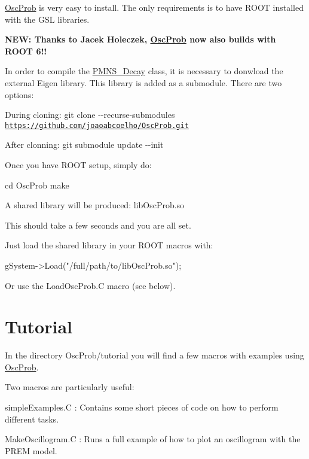 \hyperlink{namespaceOscProb}{Osc\+Prob} is very easy to install. The only requirements is to have R\+O\+OT installed with the G\+SL libraries.

{\bfseries N\+EW\+: Thanks to Jacek Holeczek, \hyperlink{namespaceOscProb}{Osc\+Prob} now also builds with R\+O\+OT 6!!}

In order to compile the \hyperlink{classOscProb_1_1PMNS__Decay}{P\+M\+N\+S\+\_\+\+Decay} class, it is necessary to donwload the external Eigen library. This library is added as a submodule. There are two options\+:
\begin{DoxyItemize}
\item During cloning\+: {\ttfamily git clone -\/-\/recurse-\/submodules \href{https://github.com/joaoabcoelho/OscProb.git}{\tt https\+://github.\+com/joaoabcoelho/\+Osc\+Prob.\+git}}
\item After clonning\+: {\ttfamily git submodule update -\/-\/init}
\end{DoxyItemize}

Once you have R\+O\+OT setup, simply do\+: 
\begin{DoxyCode}
cd OscProb
make
\end{DoxyCode}


A shared library will be produced\+: {\ttfamily lib\+Osc\+Prob.\+so}

This should take a few seconds and you are all set.

Just load the shared library in your R\+O\+OT macros with\+: 
\begin{DoxyCode}
gSystem->Load(\textcolor{stringliteral}{"/full/path/to/libOscProb.so"});
\end{DoxyCode}


Or use the {\ttfamily Load\+Osc\+Prob.\+C} macro (see below).

\section*{Tutorial}

In the directory Osc\+Prob/tutorial you will find a few macros with examples using \hyperlink{namespaceOscProb}{Osc\+Prob}.

Two macros are particularly useful\+:
\begin{DoxyItemize}
\item {\ttfamily simple\+Examples.\+C} \+: Contains some short pieces of code on how to perform different tasks.
\item {\ttfamily Make\+Oscillogram.\+C} \+: Runs a full example of how to plot an oscillogram with the P\+R\+EM model.
\end{DoxyItemize}


